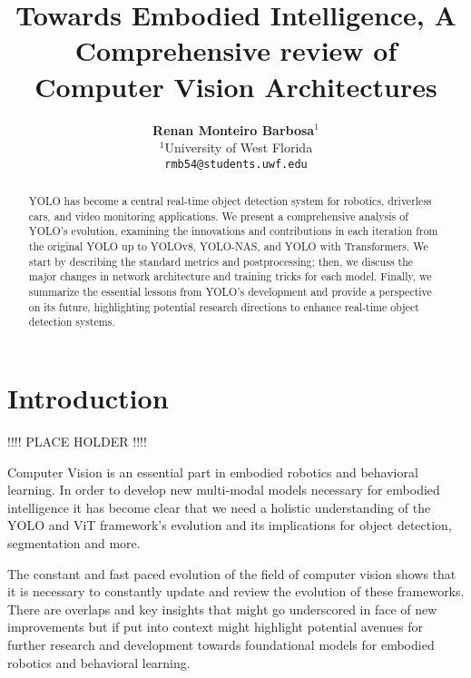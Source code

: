 \documentclass{article}
\title{Towards Embodied Intelligence, A Comprehensive review of Computer Vision Architectures}
\author{
  \textbf{Renan Monteiro Barbosa$^{1}$} \\ 
  $^{1}$University of West Florida \\ 
  \texttt{rmb54@students.uwf.edu}
}
\begin{document}
\maketitle



\begin{abstract}
    YOLO has become a central real-time object detection system for robotics, driverless cars, and video
    monitoring applications. We present a comprehensive analysis of YOLO’s evolution, examining the
    innovations and contributions in each iteration from the original YOLO up to YOLOv8, YOLO-NAS,
    and YOLO with Transformers. We start by describing the standard metrics and postprocessing; then,
    we discuss the major changes in network architecture and training tricks for each model. Finally, we
    summarize the essential lessons from YOLO’s development and provide a perspective on its future,
    highlighting potential research directions to enhance real-time object detection systems.
\end{abstract}


\section{Introduction}

!!!! PLACE HOLDER !!!!

Computer Vision is an essential part in embodied robotics and behavioral learning. In order to develop new multi-modal models necessary for embodied intelligence it has become clear that we need a holistic understanding of the YOLO and ViT framework’s evolution and its implications for object detection, segmentation and more.

The constant and fast paced evolution of the field of computer vision shows that it is necessary to constantly update and review the evolution of these frameworks. 
There are overlaps and key insights that might go underscored in face of new improvements but if put into context might highlight potential avenues for further research and development towards foundational models for embodied robotics and behavioral learning.
\end{document}
